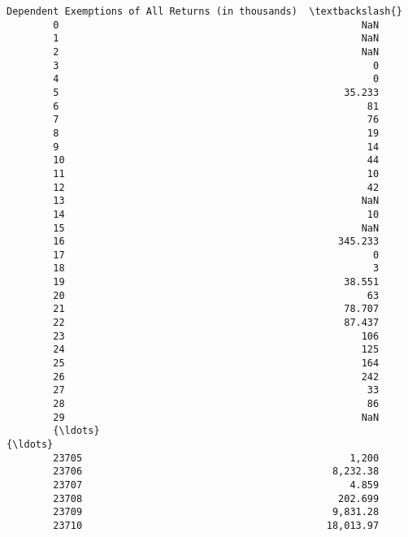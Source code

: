 \documentclass[11pt]{article}
\begin{document}
\begin{Verbatim}[commandchars=\\\{\}]
              Dependent Exemptions of All Returns (in thousands)  \textbackslash{}
        0                                                    NaN   
        1                                                    NaN   
        2                                                    NaN   
        3                                                      0   
        4                                                      0   
        5                                                 35.233   
        6                                                     81   
        7                                                     76   
        8                                                     19   
        9                                                     14   
        10                                                    44   
        11                                                    10   
        12                                                    42   
        13                                                   NaN   
        14                                                    10   
        15                                                   NaN   
        16                                               345.233   
        17                                                     0   
        18                                                     3   
        19                                                38.551   
        20                                                    63   
        21                                                78.707   
        22                                                87.437   
        23                                                   106   
        24                                                   125   
        25                                                   164   
        26                                                   242   
        27                                                    33   
        28                                                    86   
        29                                                   NaN   
        {\ldots}                                                  {\ldots}   
        23705                                              1,200   
        23706                                           8,232.38   
        23707                                              4.859   
        23708                                            202.699   
        23709                                           9,831.28   
        23710                                          18,013.97   

\end{Verbatim}
\end{document}
